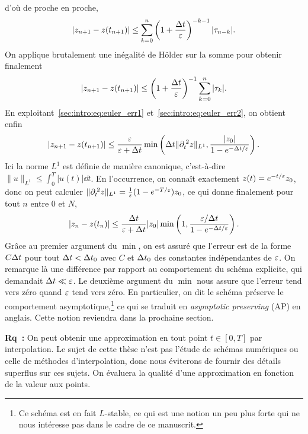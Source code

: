 d'où de proche en proche,
\begin{equation*}
    \left| z_{n+1} - z(t_{n+1}) \right| 
    \leq \sum_{k = 0}^n 
        \left(1 + \frac{\Delta t}{\varepsilon}\right)^{-k-1} |\tau_{n-k}| .
\end{equation*}
On applique brutalement une inégalité de Hölder sur la somme pour
obtenir finalement 
\begin{equation*}
    \left| z_{n+1} - z(t_{n+1}) \right| 
    \leq \left(1 + \frac{\Delta t}{\varepsilon}\right)^{-1} 
        \sum_{k = 0}^n |\tau_{k}| .
\end{equation*}
En exploitant~\eqref{sec:intro:eq:euler_err1}
et~\eqref{sec:intro:eq:euler_err2}, on obtient enfin 
\begin{equation*}
    \left| z_{n+1} - z(t_{n+1}) \right| 
    \leq \frac{\varepsilon}{\varepsilon + \Delta t} \min\left( 
        \Delta t \| \partial_t^{\:2} z \|_{L^1} ,
        \frac{ |z_0| }{ 1 - e^{-\Delta t/\varepsilon} } \right) .
\end{equation*}
Ici la norme $L^1$ est définie de manière canonique, c'est-à-dire $ \| u
\|_{L^1} \leq \int_0^T | u(t) | \dd t $. En l'occurrence, on connaît
exactement $z(t) = e^{-t/\varepsilon} z_0$, donc on peut calculer $\|
\partial_t^{\:2} z \|_{L^1} = \frac{1}{\varepsilon}(1 - e^{-T/\varepsilon}) z_0$, ce qui
donne finalement pour tout $n$ entre $0$ et $N$, 
\begin{equation*}
    \left| z_n - z(t_n) \right| 
    \leq \frac{\Delta t}{\varepsilon + \Delta t} |z_0| \min \left(
        1, \frac{\varepsilon/\Delta t}{1 - e^{-\Delta t/\varepsilon}}
    \right) .
\end{equation*}
Grâce au premier argument du $\min$, on est assuré que l'erreur est de
la forme $C\Delta t$ pour tout $\Delta t < \Delta t_0$ avec $C$ et $\Delta t_0$ des
constantes indépendantes de $\varepsilon$. On remarque là une différence par
rapport au comportement du schéma explicite, qui demandait $\Delta t \ll
\varepsilon$. 
%
Le deuxième argument du $\min$ nous assure que l'erreur tend vers zéro
quand $\varepsilon$ tend vers zéro. En particulier, on dit le schéma préserve
le comportement asymptotique,\footnote{Ce schéma est en fait $L$-stable,
ce qui est une notion un peu plus forte qui ne nous intéresse pas dans
le cadre de ce manuscrit.} ce qui se traduit en \textit{asymptotic
preserving} (AP) en anglais. Cette notion reviendra dans la prochaine
section. 



\bigskip\bigskip\bigskip
\textbf{Rq~:} On peut obtenir une approximation en tout point $t \in
[0,T]$ par interpolation. Le sujet de cette thèse n'est pas l'étude de
schémas numériques ou celle de méthodes d'interpolation, donc nous
éviterons de fournir des détails superflus sur ces sujets. On évaluera
la qualité d'une approximation en fonction de la valeur aux points. 

